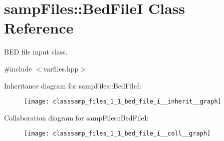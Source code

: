 \hypertarget{classsamp_files_1_1_bed_file_i}{}\section{samp\+Files\+:\+:Bed\+FileI Class Reference}
\label{classsamp_files_1_1_bed_file_i}


B\+ED file input class.  




{\ttfamily \#include $<$varfiles.\+hpp$>$}



Inheritance diagram for samp\+Files\+:\+:Bed\+FileI\+:\nopagebreak
\begin{figure}[H]
\begin{center}
\leavevmode
\texttt{[image: classsamp\_files\_1\_1\_bed\_file\_i\_\_inherit\_\_graph]}
\end{center}
\end{figure}


Collaboration diagram for samp\+Files\+:\+:Bed\+FileI\+:\nopagebreak
\begin{figure}[H]
\begin{center}
\leavevmode
\texttt{[image: classsamp\_files\_1\_1\_bed\_file\_i\_\_coll\_\_graph]}
\end{center}
\end{figure}
